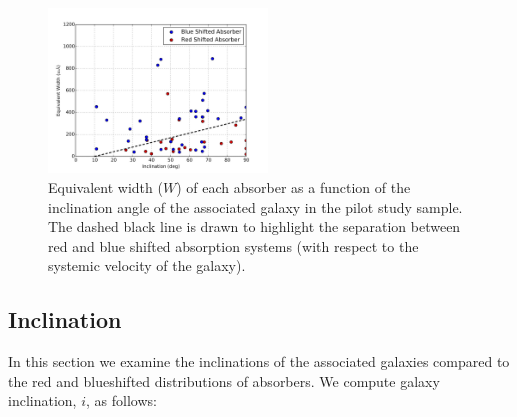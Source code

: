 \documentclass[iop]{emulateapj-rtx4}
\begin{document}
%



\begin{figure}[h!]
        \centering
        \includegraphics[width=0.52\textwidth]{W(fancy_inclination)_dif_annotated.jpg}
        \caption{\small{Equivalent width ($W$) of each absorber as a function of the inclination angle of the associated galaxy in the pilot study sample. The dashed black line is drawn to highlight the separation between red and blue shifted absorption systems (with respect to the systemic velocity of the galaxy).}}
        \label{ew_vs_inclination}
        \vspace{2pt}
\end{figure} 



\subsection{Inclination}
In this section we examine the inclinations of the associated galaxies compared to the red and blueshifted distributions of absorbers. We compute galaxy inclination, $i$, as follows:
\end{document}
